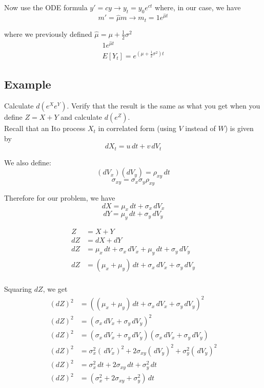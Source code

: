 \documentclass[11pt]{article}
\begin{document}
\begin{enumerate}
    Now use the ODE formula $y' = cy \rightarrow y_t = y_0 e^{ct}$ where, in our case, we have
    \[m' = \hat{\mu} m \rightarrow m_t = 1 e^{\hat{\mu}t}\]

    where we previously defined $\hat{\mu} = \mu + \frac{1}{2} \sigma^2$
    \begin{align*}
        1 e^{\hat{\mu}t} \\
        E[Y_t]=e^{(\mu + \frac{1}{2} \sigma^2)t}
    \end{align*}

\end{enumerate}

\subsection{Example}
Calculate $d(e^X e^Y)$. Verify that the result is the same as what you get when you define 
$Z=X+Y$ and calculate $d(e^Z)$. \\ 

Recall that an Ito process $X_t$ in correlated form (using $V$ instead of $W$) is given by 
\[ dX_t = u\,dt + v\,dV_t \]

We also define: 
\[(dV_x)(dV_y) = \rho_{xy} \,dt\]
\[\sigma_{xy} = \sigma_x \sigma_y \rho_{xy}\]

Therefore for our problem, we have
\[ dX = \mu_x\,dt + \sigma_x\,dV_x \]
\[ dY = \mu_y\,dt + \sigma_y\,dV_y \]

\begin{align*}
    Z &= X+Y \\
    dZ &= dX + dY \\
    dZ &= \mu_x\,dt + \sigma_x\,dV_x + \mu_y\,dt + \sigma_y\,dV_y \\
    dZ &= (\mu_x + \mu_y)\,dt + \sigma_x\,dV_x + \sigma_y\,dV_y \\
\end{align*}

Squaring $dZ$, we get
\begin{align*}
    {(dZ)}^2 &= {((\mu_x + \mu_y)\,dt + \sigma_x\,dV_x + \sigma_y\,dV_y)}^2 \\
    {(dZ)}^2 &= {(\sigma_x\,dV_x + \sigma_y\,dV_y)}^2 \\
    {(dZ)}^2 &= (\sigma_x\,dV_x + \sigma_y\,dV_y)(\sigma_x\,dV_x + \sigma_y\,dV_y) \\
    {(dZ)}^2 &= \sigma_x^2{(\,dV_x)}^2 + 2 \sigma_{xy} {(\,dV_y)}^2 + \sigma_y^2{(\,dV_y)}^2 \\
    {(dZ)}^2 &= \sigma_x^2 \,dt + 2 \sigma_{xy} \,dt + \sigma_y^2 \,dt \\
    {(dZ)}^2 &= {(\sigma_x^2 + 2 \sigma_{xy} + \sigma_y^2)} \,dt \\
\end{align*}
\end{document}
